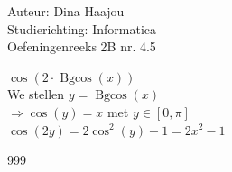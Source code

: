 \documentclass[a4paper]{article}
\begin{document}
\noindent \large Auteur: Dina Haajou \\
\noindent \large Studierichting: Informatica \\
\noindent \large Oefeningenreeks 2B nr. 4.5 \\

\medskip

\normalsize

$\cos(2 \cdot \operatorname{Bgcos}(x))$ \\

We stellen $y = \operatorname{Bgcos}(x)$ \\

$\Rightarrow \cos(y) = x$ met $y \in [0, \pi]$ \\

$\cos(2y) = 2\cos^2(y) - 1 = 2x^2 - 1$

\begin{thebibliography}{999}
\end{thebibliography}
\end{document}
